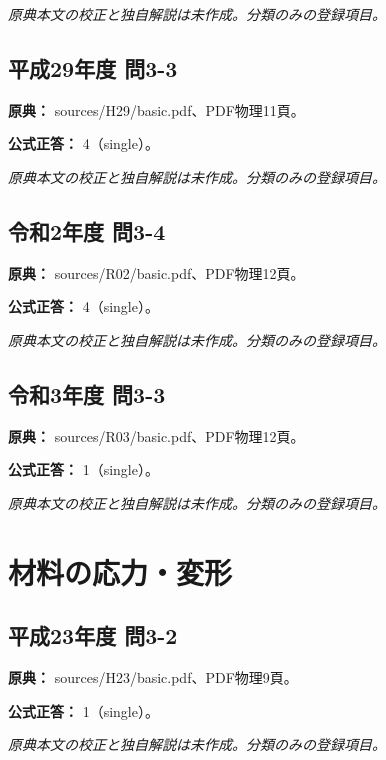 \par\textit{原典本文の校正と独自解説は未作成。分類のみの登録項目。}

\subsection{平成29年度 問3-3}
\label{q:h29-reg-basic-3-3}

\noindent\textbf{原典：} sources/H29/basic.pdf、PDF物理11頁。

\textbf{公式正答：} 4（single）。

\par\textit{原典本文の校正と独自解説は未作成。分類のみの登録項目。}

\subsection{令和2年度 問3-4}
\label{q:r02-reg-basic-3-4}

\noindent\textbf{原典：} sources/R02/basic.pdf、PDF物理12頁。

\textbf{公式正答：} 4（single）。

\par\textit{原典本文の校正と独自解説は未作成。分類のみの登録項目。}

\subsection{令和3年度 問3-3}
\label{q:r03-reg-basic-3-3}

\noindent\textbf{原典：} sources/R03/basic.pdf、PDF物理12頁。

\textbf{公式正答：} 1（single）。

\par\textit{原典本文の校正と独自解説は未作成。分類のみの登録項目。}

\section{材料の応力・変形}

\subsection{平成23年度 問3-2}
\label{q:h23-reg-basic-3-2}

\noindent\textbf{原典：} sources/H23/basic.pdf、PDF物理9頁。

\textbf{公式正答：} 1（single）。

\par\textit{原典本文の校正と独自解説は未作成。分類のみの登録項目。}

